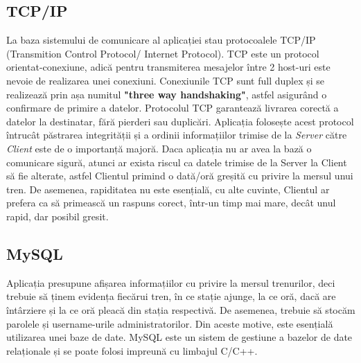 \documentclass[runningheads]{llncs}
\begin{document}
	\subsection{TCP/IP}
	La baza sistemului de comunicare al aplicației stau protocoalele TCP/IP (Transmition Control Protocol/ Internet Protocol).
	TCP este un protocol orientat-conexiune, adică pentru transmiterea mesajelor între 2 host-uri este nevoie de realizarea unei conexiuni.
	Conexiunile TCP sunt full duplex și se realizează prin așa numitul \textbf{"three way handshaking"},
	astfel asigurând o confirmare de primire a datelor.
	Protocolul TCP garantează livrarea corectă a datelor la destinatar, fără pierderi sau duplicări.
	Aplicația folosește acest protocol întrucât păstrarea integrității  și a ordinii informațiilor trimise de la \textit{Server} către \textit{Client} este de o importanță majoră.
	Daca aplicația nu ar avea la bază o comunicare sigură, atunci ar exista riscul ca datele trimise de la Server la Client să fie alterate, astfel Clientul primind o dată/oră greșită cu privire la mersul unui tren.
	De asemenea, rapiditatea nu este esențială, cu alte cuvinte, Clientul ar prefera ca să primească un raspuns corect, într-un timp mai mare, decât unul rapid, dar posibil gresit.
	
	
	\subsection{MySQL}
	Aplicația presupune afișarea informațiilor cu privire la mersul trenurilor, deci trebuie să ținem evidența fiecărui tren, în ce stație ajunge, la ce oră, dacă are întârziere și la ce oră pleacă din stația respectivă.
	De asemenea, trebuie să stocăm parolele și username-urile administratorilor.
	Din aceste motive, este esențială utilizarea unei baze de date.
	MySQL este un sistem de gestiune a bazelor de date relaționale și se poate folosi impreună cu limbajul C/C++.
	\\ \\ \\ \\ \\ \\ \\ \\ \\ \\ \\ \\
\end{document}
